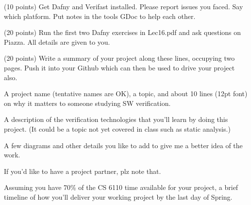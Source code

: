 \documentclass[11pt]{article}
\begin{document}
\begin{compactenum}
\begin{compactenum}
\begin{compactenum}
    \item (10 points)
      Get Dafny and Verifast installed. Please report issues you faced.
      Say which platform. Put notes in the tools GDoc to help each other.
    \end{compactenum}
    
  \item (20 points)
    Run the first two Dafny exercises in Lec16.pdf and ask questions
    on Piazza. All details are given to you.
  \end{compactenum}


  
\begin{minipage}{\minpagw}
\end{minipage}

\item (20 points)
  Write a summary of your project along these lines, occupying two pages.
  Push it into your Github which can then be used to drive your project also.
  \begin{compactitem}
  \item A project name (tentative names are OK), a topic,
    and about 10 lines (12pt font) on why it matters to
    someone studying SW verification.
    
  \item A description of the verification technologies that you'll learn
    by doing this project. (It could be a topic not yet covered in class
    such as static analysis.)

  \item A few diagrams and other details you like to add to give me a better
    idea of the work.

  \item If you'd like to have a project partner, plz note that.

  \item Assuming you have 70\% of the CS 6110 time available for your
    project, a brief timeline of how you'll deliver your working project
    by the last day of Spring.
  \end{compactitem}
  
\begin{minipage}{\minpagw}
\end{minipage}  
  


\end{compactenum}
\end{document}
